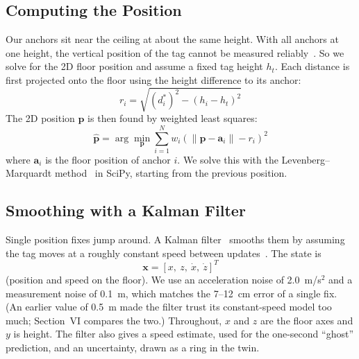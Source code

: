 \documentclass[conference]{IEEEtran}
\begin{document}
\subsection{Computing the Position}
Our anchors sit near the ceiling at about the same height. With all anchors
at one height, the vertical position of the tag cannot be measured
reliably~\cite{torrieri1984statistical}. So we solve for the 2D floor
position and assume a fixed tag height $h_t$. Each distance is first
projected onto the floor using the height difference to its anchor:
\begin{equation}
r_i = \sqrt{(d_i^*)^2 - (h_i - h_t)^2}
\end{equation}
The 2D position $\mathbf{p}$ is then found by weighted least squares:
\begin{equation}
\hat{\mathbf{p}} = \arg\min_{\mathbf{p}} \sum_{i=1}^{N} w_i
\left( \lVert \mathbf{p} - \mathbf{a}_i \rVert - r_i \right)^2
\end{equation}
where $\mathbf{a}_i$ is the floor position of anchor $i$. We solve this
with the Levenberg--Marquardt method~\cite{marquardt1963algorithm} in
SciPy, starting from the previous position.

\subsection{Smoothing with a Kalman Filter}
Single position fixes jump around. A Kalman filter~\cite{kalman1960new}
smooths them by assuming the tag moves at a roughly constant speed between
updates~\cite{li2003survey}. The state is
\begin{equation}
\mathbf{x} = [x,\ z,\ \dot{x},\ \dot{z}]^T
\end{equation}
(position and speed on the floor). We use an acceleration noise of
2.0~m/s$^2$ and a measurement noise of 0.1~m, which matches the 7--12~cm
error of a single fix. (An earlier value of 0.5~m made the filter trust its
constant-speed model too much; Section~VI compares the two.) Throughout, $x$
and $z$ are the floor axes and $y$ is height. The filter also gives a speed
estimate, used for the one-second ``ghost'' prediction, and an uncertainty,
drawn as a ring in the twin.
\end{document}

